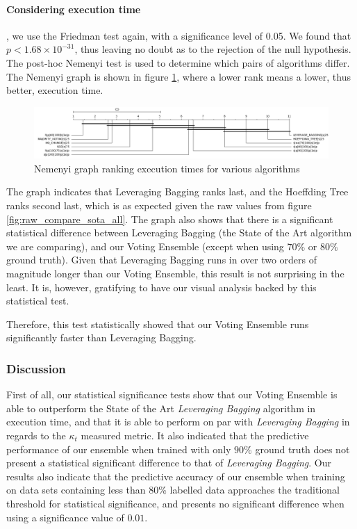 \documentclass[runningheads]{llncs}
\begin{document}
\paragraph{Considering execution time}, we use the Friedman test again, with a significance level of 0.05. We found that $p < 1.68\times10^{-31}$, thus leaving no doubt as to the rejection of the null hypothesis. The post-hoc Nemenyi test is used to determine which pairs of algorithms differ. The Nemenyi graph is shown in figure  \ref{fig:sota_compare_all_execution_time_nemenyi}, where a lower rank means a lower, thus better, execution time.

\begin{figure}
  \includegraphics[width=\linewidth]{./images/chapter5/sota_compare_all_execution_time_nemenyi}
\caption{\label{fig:sota_compare_all_execution_time_nemenyi}Nemenyi graph ranking execution times for various algorithms}
\end{figure}

The graph indicates that Leveraging Bagging ranks last, and the Hoeffding Tree ranks second last, which is as expected given the raw values from figure \ref{fig:raw_compare_sota_all}.
The graph also shows that there is a significant statistical difference between Leveraging Bagging (the State of the Art algorithm we are comparing), and our Voting Ensemble (except when using $70\%$ or $80\%$ ground truth). Given that Leveraging Bagging runs in over two orders of magnitude longer than our Voting Ensemble, this result is not surprising in the least. It is, however, gratifying to have our visual analysis backed by this statistical test.

Therefore, this test statistically showed that our Voting Ensemble runs significantly faster than Leveraging Bagging.

\subsubsection{Discussion}
First of all, our statistical significance tests show that our Voting Ensemble is able to outperform the State of the Art \textit{Leveraging Bagging} algorithm in execution time, and that it is able to perform on par with \textit{Leveraging Bagging} in regards to the $\kappa_t$ measured metric. It also indicated that the predictive performance of our ensemble when trained with only $90\%$ ground truth does not present a statistical significant difference to that of \textit{Leveraging Bagging}. Our results also indicate that the predictive accuracy of our ensemble when training on data sets containing less than 80\% labelled data approaches the traditional threshold for statistical significance, and presents no significant difference when using a significance value of $0.01$.
\end{document}
